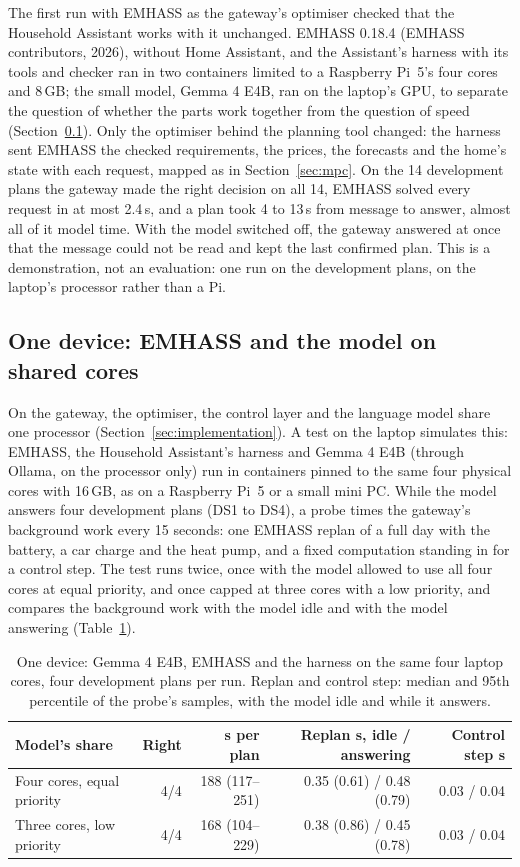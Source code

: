 \documentclass[12pt,a4paper]{report}
\begin{document}
The first run with EMHASS as the gateway's optimiser checked that the
Household Assistant works with it unchanged. EMHASS 0.18.4
(EMHASS contributors, 2026), without Home Assistant, and the Assistant's harness
with its tools and checker ran in two containers limited to a Raspberry
Pi~5's four cores and 8\,GB; the small model, Gemma 4 E4B, ran on the
laptop's GPU, to separate the question of whether the parts work
together from the question of speed (Section~\ref{sec:onedevice}).
Only the optimiser behind the planning tool changed: the harness sent
EMHASS the checked requirements, the prices, the forecasts and the
home's state with each request, mapped as in Section~\ref{sec:mpc}. On
the 14 development plans the gateway made the right decision on all 14,
EMHASS solved every request in at most 2.4\,s, and a plan took 4 to
13\,s from message to answer, almost all of it model time. With the
model switched off, the gateway answered at once that the message could
not be read and kept the last confirmed plan. This is a demonstration,
not an evaluation: one run on the development plans, on the laptop's
processor rather than a Pi.

\subsection{One device: EMHASS and the model on shared cores}
\label{sec:onedevice}

On the gateway, the optimiser, the control layer and the language model
share one processor (Section~\ref{sec:implementation}). A test on the
laptop simulates this: EMHASS, the Household Assistant's harness and
Gemma 4 E4B (through Ollama, on the processor only) run in containers
pinned to the same four physical cores with 16\,GB, as on a Raspberry
Pi~5 or a small mini PC. While the model answers four development plans
(DS1 to DS4), a probe times the gateway's background work every 15
seconds: one EMHASS replan of a full day with the battery, a car charge
and the heat pump, and a fixed computation standing in for a control
step. The test runs twice, once with the model allowed to use all four
cores at equal priority, and once capped at three cores with a low
priority, and compares the background work with the model idle and with
the model answering (Table~\ref{tab:onedevice}).

\begin{table}[htbp]
\caption{One device: Gemma 4 E4B, EMHASS and the harness on the same
four laptop cores, four development plans per run. Replan and control
step: median and 95th percentile of the probe's samples, with the model
idle and while it answers.}
\label{tab:onedevice}
\small
\begin{tabularx}{\textwidth}{@{}Xrrrr@{}}
\toprule
Model's share & Right & s per plan & Replan s, idle / answering & Control step s \\
\midrule
Four cores, equal priority & 4/4 & 188 (117--251) & 0.35 (0.61) / 0.48 (0.79) & 0.03 / 0.04 \\
Three cores, low priority & 4/4 & 168 (104--229) & 0.38 (0.86) / 0.45 (0.78) & 0.03 / 0.04 \\
\bottomrule
\end{tabularx}
\end{table}
\end{document}
